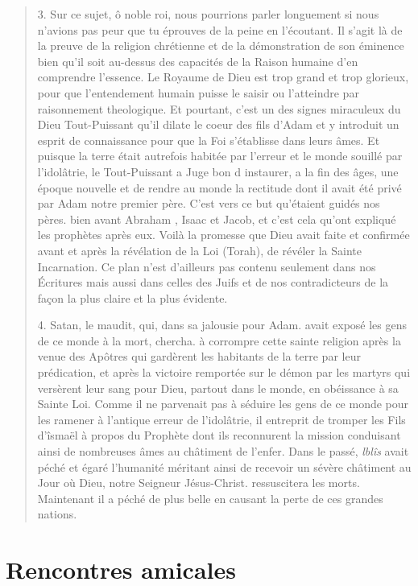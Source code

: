 \begin{quote}
3. Sur ce sujet, ô noble roi, nous pourrions parler longuement si nous n'avions pas peur que tu éprouves de la peine en l'écoutant. Il s'agit là de la preuve
de la religion chrétienne et de la démonstration de son éminence bien qu'il soit au-dessus des capacités de la Raison humaine d'en comprendre l'essence. Le Royaume
de Dieu est trop grand et trop glorieux, pour que l'entendement humain puisse le saisir ou l'atteindre par raisonnement theologique. Et pourtant, c'est un des signes
miraculeux du Dieu Tout-Puissant qu'il dilate le coeur des fils d'Adam et y introduit
un esprit de connaissance pour que la Foi s'établisse dans leurs âmes. Et puisque la
terre était autrefois habitée par l'erreur et le monde souillé par l'idolâtrie, le Tout-Puissant
a Juge bon d instaurer, a la fin des âges, une époque nouvelle et de rendre
au monde la rectitude dont il avait été privé par Adam notre premier père.
C'est vers ce but qu'étaient guidés nos pères. bien avant Abraham , Isaac et
Jacob, et c'est cela qu'ont expliqué les prophètes après eux. Voilà la promesse que
Dieu avait faite et confirmée avant et après la révélation de la Loi (Torah), de
révéler la Sainte Incarnation. Ce plan n'est d'ailleurs pas contenu seulement dans
nos Écritures mais aussi dans celles des Juifs et de nos contradicteurs de la façon la
plus claire et la plus évidente.


4. Satan, le maudit, qui, dans sa jalousie pour Adam. avait exposé les gens
de ce monde à la mort, chercha. à corrompre cette sainte religion après la venue des
Apôtres qui gardèrent les habitants de la terre par leur prédication, et après la
victoire remportée sur le démon par les martyrs qui versèrent leur sang pour Dieu,
partout dans le monde, en obéissance à sa Sainte Loi. Comme il ne parvenait pas à
séduire les gens de ce monde pour les ramener à l'antique erreur de l'idolâtrie, il
entreprit de tromper les Fils d'îsmaël à propos du Prophète dont ils reconnurent la
mission conduisant ainsi de nombreuses âmes au châtiment de l'enfer. Dans le
passé, \textit{lblîs} avait péché et égaré l'humanité méritant ainsi de recevoir un sévère
châtiment au Jour où Dieu, notre Seigneur Jésus-Christ. ressuscitera les morts.
Maintenant il a péché de plus belle en causant la perte de ces grandes nations.
\end{quote}


\section{Rencontres amicales}


